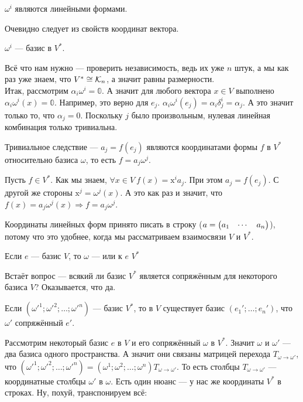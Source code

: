 \documentclass{article}
\begin{document}
\begin{itemize}
\begin{Proof}
        \end{Proof}
        \thm $\omega^i$ являются линейными формами.
        \begin{Proof}
            Очевидно следует из свойств координат вектора.
        \end{Proof}
        \thm $\omega^i$ --- базис в $V^*$.
        \begin{Proof}
            Всё что нам нужно --- проверить независимость, ведь их уже $n$ штук, а мы как раз уже знаем, что $V^*\cong{\mathcal{K}}_n$, а значит равны размерности.\\
            Итак, рассмотрим $\alpha_i\omega^i=\mathbb0$. А значит для любого вектора $x\in V$ выполнено $\alpha_i\omega^i(x)=\mathbb0$. Например, это верно для $e_j$. $\alpha_i\omega^i(e_j)=\alpha_i\delta_j^i=\alpha_j$. А это значит только то, что $\alpha_j=0$. Поскольку $j$ было произвольным, нулевая линейная комбинация только тривиальна.
        \end{Proof}
        \thm Тривиальное следствие --- $a_j=f(e_j)$ являются координатами формы $f$ в $V^*$ относительно базиса $\omega$, то есть $f=a_j\omega^j$.
        \begin{Proof}
            Пусть $f\in V^*$. Как мы знаем, $\forall x\in V~f(x)=\mathrm x^ia_j$. При этом $a_j=f(e_j)$. С другой же стороны $\mathrm x^j=\omega^j(x)$. А это как раз и значит, что $f(x)=a_j\omega^j(x)\Rightarrow f=a_j\omega^j$.
        \end{Proof}
        \begin{Comment}
            Координаты линейных форм принято писать в строку ($a=\left(\begin{matrix}a_1 & \cdots & a_n\end{matrix}\right)$), потому что это удобнее, когда мы рассматриваем взаимосвязи $V$ и $V^*$.
        \end{Comment}
        \dfn Если $e$ --- базис $V$, то $\omega$ ---  или  к $e$  $V^*$
        \begin{Comment}
            Встаёт вопрос --- всякий ли базис $V^*$ является сопряжённым для некоторого базиса $V$? Оказывается, что да.
        \end{Comment}
        \thm Если $({\omega'}^1;{\omega'}^2;\ldots;{\omega'}^n)$ --- базис $V^*$, то в $V$ существует базис $(e_1';\ldots;e_n')$, что $\omega'$ сопряжённый $e'$.
        \begin{Proof}
            Рассмотрим некоторый базис $e$ в $V$ и его сопряжённый $\omega$ в $V^*$. Значит $\omega$ и $\omega'$ --- два базиса одного пространства. А значит они связаны матрицей перехода $T_{\omega\to\omega'}$, что $({\omega'}^1;{\omega'}^2;\ldots;{\omega'}^n)=({\omega}^1;{\omega}^2;\ldots;{\omega}^n)T_{\omega\to\omega'}$. То есть столбцы $T_{\omega\to\omega'}$ --- координатные столбцы $\omega'$ в $\omega$. Есть один нюанс --- у нас же координаты $V^*$ в строках. Ну, похуй, транспонируем всё:

\end{Proof}
\end{itemize}
\end{document}

